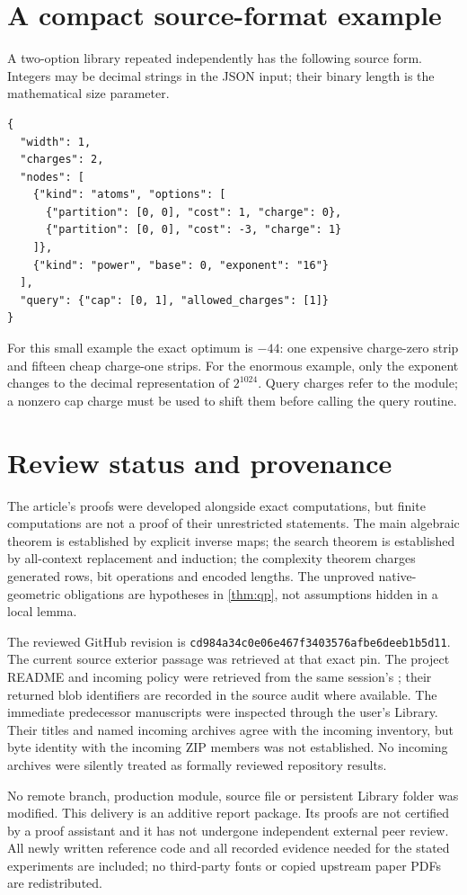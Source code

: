 \documentclass[11pt,a4paper]{article}
\theoremstyle{definition}
\newcommand{\code}[1]{\texttt{\detokenize{#1}}}
\newcommand{\pin}{\texttt{cd984a34c0e06e467f3403576afbe6deeb1b5d11}}
\begin{document}
\section{A compact source-format example}
A two-option library repeated independently has the following source form. Integers may be decimal strings in the JSON input; their binary length is the mathematical size parameter.
\begin{lstlisting}
{
  "width": 1,
  "charges": 2,
  "nodes": [
    {"kind": "atoms", "options": [
      {"partition": [0, 0], "cost": 1, "charge": 0},
      {"partition": [0, 0], "cost": -3, "charge": 1}
    ]},
    {"kind": "power", "base": 0, "exponent": "16"}
  ],
  "query": {"cap": [0, 1], "allowed_charges": [1]}
}
\end{lstlisting}
For this small example the exact optimum is $-44$: one expensive charge-zero strip and fifteen cheap charge-one strips. For the enormous example, only the exponent changes to the decimal representation of $2^{1024}$. Query charges refer to the module; a nonzero cap charge must be used to shift them before calling the query routine.

\section{Review status and provenance}
The article's proofs were developed alongside exact computations, but finite computations are not a proof of their unrestricted statements. The main algebraic theorem is established by explicit inverse maps; the search theorem is established by all-context replacement and induction; the complexity theorem charges generated rows, bit operations and encoded lengths. The unproved native-geometric obligations are hypotheses in \cref{thm:qp}, not assumptions hidden in a local lemma.

The reviewed GitHub revision is \pin. The current source exterior passage was retrieved at that exact pin. The project README and incoming policy were retrieved from the same session's \code{main}; their returned blob identifiers are recorded in the source audit where available. The immediate predecessor manuscripts were inspected through the user's Library. Their titles and named incoming archives agree with the incoming inventory, but byte identity with the incoming ZIP members was not established. No incoming archives were silently treated as formally reviewed repository results.

No remote branch, production module, source file or persistent Library folder was modified. This delivery is an additive report package. Its proofs are not certified by a proof assistant and it has not undergone independent external peer review. All newly written reference code and all recorded evidence needed for the stated experiments are included; no third-party fonts or copied upstream paper PDFs are redistributed.
\end{document}
